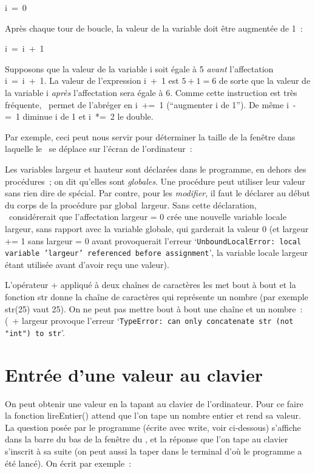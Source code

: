 \mbox{\blc  \blk\blk\idt  i\ =\ 0}\par

\noindent Après chaque tour de boucle, la valeur de la variable doit être augmentée de 1~:

\mbox{\blc  \blk\blk\idt  i\ =\ i\ +\ 1}\par

\noindent Supposons que la valeur de la variable {\idt i} soit égale à 5 {\em avant} l'affectation
\mbox{\idt  i\ =\ i\ +\ 1}. La valeur de l'expression {\idt  i\ +\ 1}
est $5 + 1 = 6$ de sorte que la valeur de la variable {\idt i} {\em après} l'affectation sera égale
à 6. Comme cette instruction est très fréquente, \python\ permet de l'abréger en
\mbox{\idt  i\ +=\ 1} (``augmenter {\idt i} de 1''). De même \mbox{\idt  i\ -=\ 1} diminue {\idt i}
de 1 et \mbox{\idt  i\ *=\ 2} le double.

Par exemple, ceci peut nous servir pour déterminer la taille de la fenêtre dans laquelle le \robot\
se déplace sur l'écran de l'ordinateur~:


\noindent Les variables {\idt largeur} et {\idt hauteur} sont déclarées dans le programme, en
dehors des procédures~; on dit qu'elles sont {\em globales}\index{Variable globale}. Une procédure
peut utiliser leur valeur sans rien dire de spécial. Par contre, pour les {\em modifier}, il faut
le déclarer au début du corps de la procédure par {\mcl global}\index{global}\ {\idt largeur}.
Sans cette déclaration, \python\ considérerait que l'affectation {\idt largeur = 0} crée une
nouvelle variable locale {\idt largeur}, sans rapport avec la variable globale, qui garderait la
valeur 0 (et {\idt largeur += 1} sans {\idt largeur = 0} avant provoquerait l'erreur
`{\tt UnboundLocalError:\ local variable 'largeur' referenced before assignment}', la variable
locale {\idt largeur} étant utilisée avant d'avoir reçu une valeur).

L'opérateur {\idt +} appliqué à deux chaînes de caractères les met bout à bout et la
fonction {\idt str} donne la chaîne de caractères qui représente un nombre (par
exemple {\idt str(25)} vaut {\cha {}25\char34}). On ne peut pas mettre bout à bout une
chaîne et un nombre~: {\cha \char34{}(\char34}\ {\idt + largeur} provoque l'erreur
`{\tt TypeError:\ can only concatenate str (not "int") to str}'.

\section{Entrée d'une valeur au clavier}
On peut obtenir une valeur en la tapant au clavier de
l'ordinateur. Pour
ce faire la fonction {\idt lireEntier()} attend que l'on tape un nombre entier et rend
sa valeur. La question posée par le programme (écrite avec {\idt write}, voir ci-dessous)
s'affiche dans la barre du bas de la fenêtre du \robot, et la réponse que l'on tape au clavier
s'inscrit à sa suite (on peut aussi la taper dans le terminal d'où le programme a été lancé).
On écrit par exemple~:


